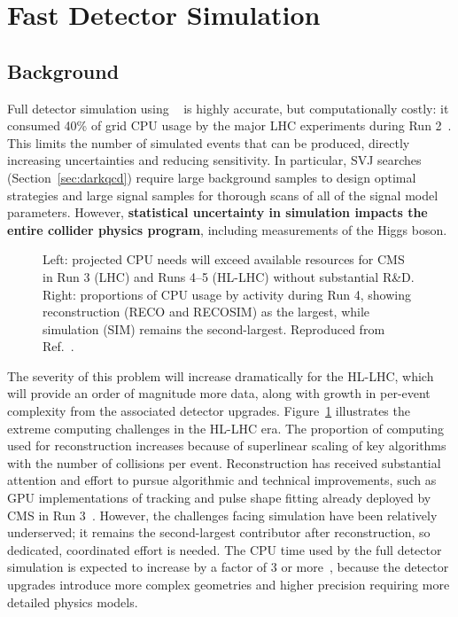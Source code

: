 \section{Fast Detector Simulation}\label{sec:ml4sim}

\subsection{Background}\label{subsec:simbkg}

Full detector simulation using \GEANTfour~\cite{Agostinelli:2002hh} is highly accurate, but computationally costly:
it consumed 40\% of grid CPU usage by the major LHC experiments during Run 2~\cite{Apostolakis:2018ieg}.
This limits the number of simulated events that can be produced, directly increasing uncertainties and reducing sensitivity.
In particular, SVJ searches (Section~\ref{sec:darkqcd}) require large background samples to design optimal strategies
and large signal samples for thorough scans of all of the signal model parameters.
However, \textbf{statistical uncertainty in simulation impacts the entire collider physics program}, including measurements of the Higgs boson.

\begin{figure}[htb!]
\centering
{}
\caption{Left: projected CPU needs will exceed available resources for CMS in Run 3 (LHC) and Runs 4--5 (HL-LHC) without substantial R\&D.
Right: proportions of CPU usage by activity during Run 4, showing reconstruction (RECO and RECOSIM) as the largest, while simulation (SIM) remains the second-largest.
Reproduced from Ref.~\cite{CMS-NOTE-2022-008}.
}
\label{fig:cmsoffcomp}
\end{figure}

The severity of this problem will increase dramatically for the HL-LHC, which will provide an order of magnitude more data,
along with growth in per-event complexity from the associated detector upgrades.
Figure~\ref{fig:cmsoffcomp} illustrates the extreme computing challenges in the HL-LHC era.
The proportion of computing used for reconstruction increases because of superlinear scaling of key algorithms with the number of collisions per event.
Reconstruction has received substantial attention and effort to pursue algorithmic and technical improvements,
such as GPU implementations of tracking and pulse shape fitting already deployed by CMS in Run 3~\cite{Bocci:2020pmi}.
However, the challenges facing simulation have been relatively underserved;
it remains the second-largest contributor after reconstruction, so dedicated, coordinated effort is needed.
The CPU time used by the full detector simulation is expected to increase by a factor of 3 or more~\cite{Pedro:2020kbk},
because the detector upgrades introduce more complex geometries and higher precision requiring more detailed physics models.

